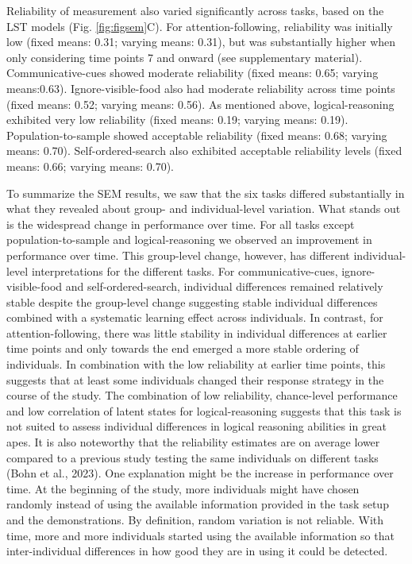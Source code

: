 \documentclass[
  man,floatsintext]{apa6}
\begin{document}
Reliability of measurement also varied significantly across tasks, based on the LST models (Fig. \ref{fig:figsem}C). For attention-following, reliability was initially low (fixed means: 0.31; varying means: 0.31), but was substantially higher when only considering time points 7 and onward (see supplementary material). Communicative-cues showed moderate reliability (fixed means: 0.65; varying means:0.63). Ignore-visible-food also had moderate reliability across time points (fixed means: 0.52; varying means: 0.56). As mentioned above, logical-reasoning exhibited very low reliability (fixed means: 0.19; varying means: 0.19). Population-to-sample showed acceptable reliability (fixed means: 0.68; varying means: 0.70). Self-ordered-search also exhibited acceptable reliability levels (fixed means: 0.66; varying means: 0.70).

To summarize the SEM results, we saw that the six tasks differed substantially in what they revealed about group- and individual-level variation. What stands out is the widespread change in performance over time. For all tasks except population-to-sample and logical-reasoning we observed an improvement in performance over time. This group-level change, however, has different individual-level interpretations for the different tasks. For communicative-cues, ignore-visible-food and self-ordered-search, individual differences remained relatively stable despite the group-level change suggesting stable individual differences combined with a systematic learning effect across individuals. In contrast, for attention-following, there was little stability in individual differences at earlier time points and only towards the end emerged a more stable ordering of individuals. In combination with the low reliability at earlier time points, this suggests that at least some individuals changed their response strategy in the course of the study. The combination of low reliability, chance-level performance and low correlation of latent states for logical-reasoning suggests that this task is not suited to assess individual differences in logical reasoning abilities in great apes. It is also noteworthy that the reliability estimates are on average lower compared to a previous study testing the same individuals on different tasks (Bohn et al., 2023). One explanation might be the increase in performance over time. At the beginning of the study, more individuals might have chosen randomly instead of using the available information provided in the task setup and the demonstrations. By definition, random variation is not reliable. With time, more and more individuals started using the available information so that inter-individual differences in how good they are in using it could be detected.
\end{document}
